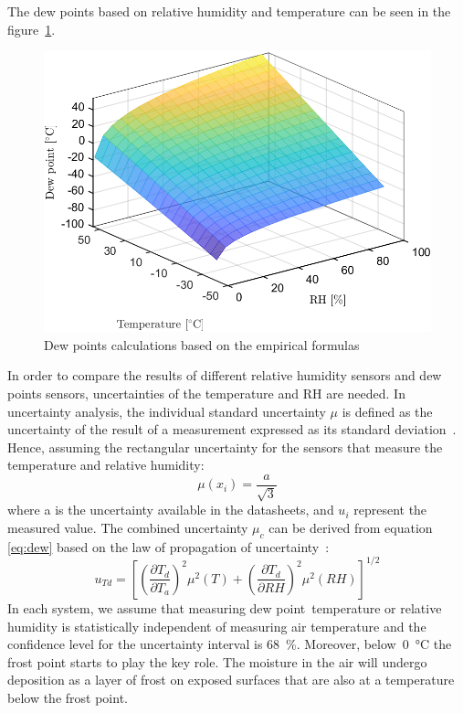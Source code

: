 The dew points based on relative humidity and temperature can be seen in the figure~\ref{fig:dewpointmagnus}.
\begin{figure}[!h]
\centering
\includegraphics[width=0.65\columnwidth]{Chapter6/images/dewpointmagnus.png}
\caption{Dew points calculations based on the empirical formulas}
\label{fig:dewpointmagnus}
\end{figure}
In order to compare the results of different relative humidity sensors and dew points sensors, uncertainties of the temperature and \gls{RH} are needed. In uncertainty analysis, the individual standard uncertainty $\mu$ is defined as the uncertainty of the result of a measurement expressed as its standard deviation~\cite{NIST_1994}. Hence, assuming the rectangular uncertainty for the sensors that measure the temperature and relative humidity:
\begin{equation}
    \mu(x_{i}) = \frac{a}{\sqrt{3}}
\end{equation}
where a is the uncertainty available in the datasheets, and $u_{i}$ represent the measured value. The combined uncertainty $\mu_{c}$ can be derived from equation \ref{eq:dew} based on the law of propagation of uncertainty~\cite{dp_uncertainty}:
\begin{equation}
    u_{Td} = \left [  \left (\frac{\partial T_{d}}{\partial T_{a}}  \right )^{2} \mu^{2}(T) + \left (\frac{\partial T_{d}}{\partial RH}  \right )^{2} \mu^{2}(RH)\right ]^{1/2}
\end{equation}
In each system, we assume that measuring dew point temperature or relative humidity is statistically independent of measuring air temperature and the confidence level for the uncertainty interval is 68~\%.  Moreover, below~\SI{0}{\celsius} the frost point starts to play the key role. The moisture in the air will undergo deposition as a layer of frost on exposed surfaces that are also at a temperature below the frost point. 

